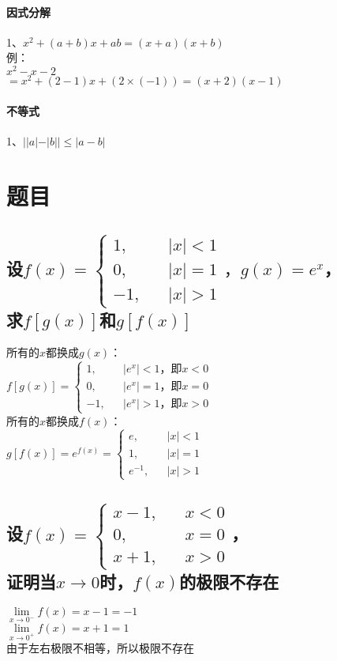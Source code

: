 \documentclass{article}
\begin{document}
\begin{flushleft}
\paragraph{因式分解}
1、$x^2+(a+b)x+ab=(x+a)(x+b)$\\
例：\\
\qquad $x^2-x-2$\\
\qquad $=x^2+(2-1)x+(2\times(-1))=(x+2)(x-1)$\\

\paragraph{不等式}
1、$||a|-|b||\le |a-b|$\\


\section{题目}

\subsection{
设$f(x)=\left\{
\begin{array}{rcl}
1,& & |x|<1\\
0,& & |x|=1\\
-1,& & |x|>1
\end{array} \right.，g(x)=e^x$，\\
求$f[g(x)]$和$g[f(x)]$
}
所有的$x$都换成$g(x)$：\\
$f[g(x)]=\left\{
\begin{array}{rcl}
1,& & |e^x|<1，\mbox{即}x<0\\
0,& & |e^x|=1，\mbox{即}x=0\\
-1,& & |e^x|>1，\mbox{即}x>0
\end{array} \right.$\\
所有的$x$都换成$f(x)$：\\
$g[f(x)]=e^{f(x)}=\left\{
\begin{array}{rcl}
e,& & |x|<1\\
1,& & |x|=1\\
e^{-1},& & |x|>1
\end{array} \right.$\\

\subsection{
设$f(x)=\left\{
\begin{array}{rcl}
x-1,& & x<0\\
0,& & x=0\\
x+1,& & x>0
\end{array} \right.$，\\
证明当$x\to 0$时，$f(x)$的极限不存在
}
$\lim\limits_{x\to 0^-}f(x)=x-1=-1$\\
$\lim\limits_{x\to 0^+}f(x)=x+1=1$\\
由于左右极限不相等，所以极限不存在\\


\end{flushleft}
\end{document}
